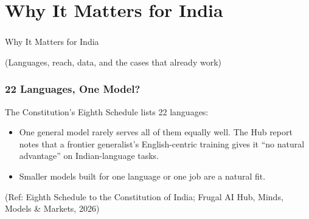 
\section[India]{Why It Matters for India}

\begin{frame}[fragile]\frametitle{}
\begin{center}
{\Large Why It Matters for India}

\medskip
{\small (Languages, reach, data, and the cases that already work)}
\end{center}
\end{frame}

\begin{frame}[fragile]\frametitle{22 Languages, One Model?}
The Constitution's Eighth Schedule lists 22 languages:
\begin{center}
\footnotesize
{}
\end{center}
\begin{itemize}
\item One general model rarely serves all of them equally well. The Hub report notes that a frontier generalist's English-centric training gives it ``no natural advantage'' on Indian-language tasks.
\item Smaller models built for one language or one job are a natural fit.
\end{itemize}
{\tiny (Ref: Eighth Schedule to the Constitution of India; Frugal AI Hub, Minds, Models \& Markets, 2026)}
\end{frame}

